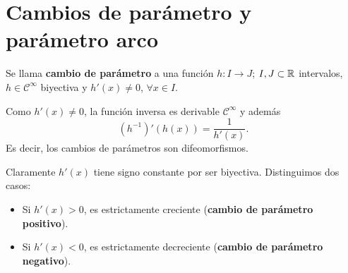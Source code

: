 \section{Cambios de parámetro y parámetro arco}
\begin{definition}
Se llama \textbf{cambio de parámetro} a una función $\displaystyle h: I \to J $; $\displaystyle I,J\subset \mathbb{R} $ intervalos, $\displaystyle h \in \mathcal{C}^{\infty} $ biyectiva y $\displaystyle h'\left(x\right)\neq 0 $, $\displaystyle \forall x \in I $.
\end{definition}
\begin{observation}
Como $\displaystyle h'\left(x\right)\neq 0 $, la función inversa es derivable $\displaystyle \mathcal{C}^{\infty} $ y además
\[\left(h^{-1}\right)'\left(h\left(x\right)\right)=\frac{1}{h'\left(x\right)} .\]
Es decir, los cambios de parámetros son difeomorfismos.
\end{observation}

\begin{notation}
Claramente $\displaystyle h'\left(x\right) $ tiene signo constante por ser biyectiva. Distinguimos dos casos:
\begin{itemize}
\item Si $\displaystyle h'\left(x\right) > 0 $, es estrictamente creciente (\textbf{cambio de parámetro positivo}).
\item Si $\displaystyle h'\left(x\right) < 0 $, es estrictamente decreciente (\textbf{cambio de parámetro negativo}).
\end{itemize}
\end{notation}

